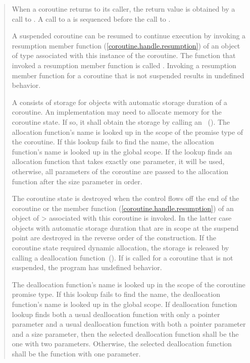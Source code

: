 \begin{quote}
\pnum
When a coroutine returns to its caller, the return value is obtained by a call to . A call to a  is sequenced before the call to .


\pnum
A suspended coroutine can be resumed
to continue execution by invoking
a resumption member function (\ref{coroutine.handle.resumption}) of an object of type  
associated with this instance of the coroutine. The function that invoked a resumption member function is called . Invoking a resumption member function for a coroutine that is not suspended results in undefined behavior. 

\pnum
A  consists of 
storage for objects with automatic storage duration of a coroutine.
An implementation may need to allocate
memory for the coroutine state. If so, it shall obtain the storage by calling an
~().
The allocation function's name is looked up in the scope of the promise type of the coroutine. If this lookup fails to find the name, the allocation function's name is looked up in the global scope. If the lookup finds an allocation function that takes exactly one parameter, it will be used, otherwise, all parameters of the coroutine are passed to the allocation function after the size parameter in order.

\pnum
The coroutine state is destroyed when
the control flows off the end of the coroutine or
the  member function (\ref{coroutine.handle.resumption}) of an object of > associated with this coroutine is invoked. In the latter case objects with automatic storage duration that are in scope
at the suspend point are destroyed in the reverse order of the construction. If the coroutine state required dynamic allocation, the storage is released by calling a deallocation
function~(). If  is called for a coroutine that is not suspended, the program has undefined behavior.

\pnum
The deallocation function's name is looked up in the scope of the coroutine promise type. If this lookup fails to find the name, the deallocation function's name is looked up in the global scope. If deallocation function lookup finds both a usual deallocation function with only a pointer parameter and a usual deallocation function with both a pointer parameter and a size parameter, then the selected deallocation function shall be the one with two parameters. Otherwise, the selected deallocation function shall be the function with one parameter. 


\end{quote}
